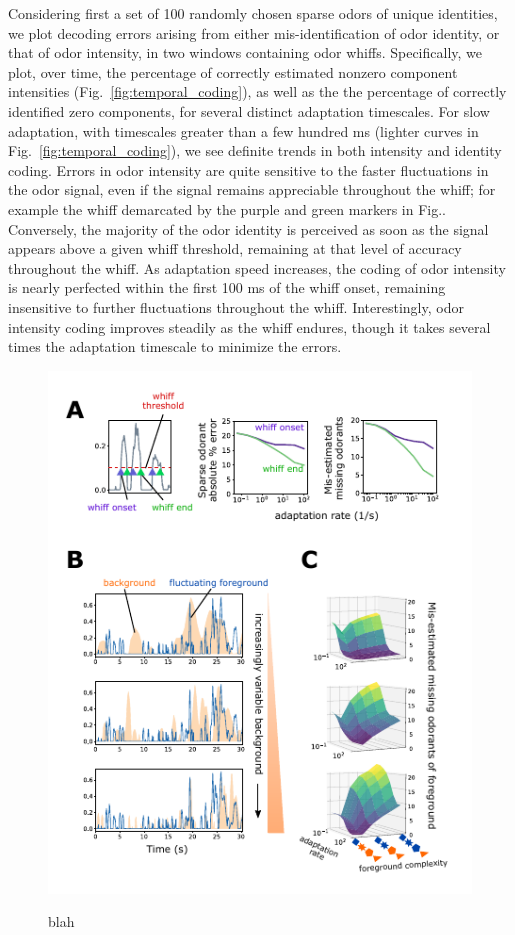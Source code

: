 Considering first a set of 100 randomly chosen sparse odors of unique identities, we plot decoding errors arising from either mis-identification of odor identity, or that of odor intensity, in two windows containing odor whiffs. Specifically, we plot, over time, the percentage of correctly estimated nonzero component intensities (Fig.~\ref{fig:temporal_coding}), as well as the the percentage of correctly identified zero components, for several distinct adaptation timescales. For slow adaptation, with timescales greater than a few hundred ms (lighter curves in Fig.~\ref{fig:temporal_coding}), we see definite trends in both intensity and identity coding. Errors in odor intensity are quite sensitive to the faster fluctuations in the odor signal, even if the signal remains appreciable throughout the whiff; for example the whiff demarcated by the purple and green markers in Fig.. Conversely, the majority of the odor identity is perceived as soon as the signal appears above a given whiff threshold, remaining at that level of accuracy throughout the whiff. As adaptation speed increases, the coding of odor intensity is nearly perfected within the first 100 ms of the whiff onset, remaining insensitive to further fluctuations throughout the whiff. Interestingly, odor intensity coding improves steadily as the whiff endures, though it takes several times the adaptation timescale to minimize the errors. 

\begin{figure}
	{\includegraphics[width=\textwidth]{figures/Figures_temporal_coding_2}}
	\caption{blah}
	\label{fig:temporal_coding_2}
\end{figure}

